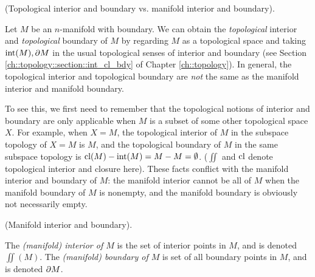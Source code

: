 \begin{remark}
     (Topological interior and boundary vs. manifold interior and boundary).
        
    Let $M$ be an $n$-manifold with boundary. We can obtain the \textit{topological} interior and \textit{topological} boundary of $M$ by regarding $M$ as a topological space and taking $\text{int}(M), \partial M$ in the usual topological senses of interior and boundary (see Section \ref{ch::topology::section::int_cl_bdy} of Chapter \ref{ch::topology}). In general, the topological interior and topological boundary are \textit{not} the same as the manifold interior and manifold boundary.
        
    To see this, we first need to remember that the topological notions of interior and boundary are only applicable when $M$ is a subset of some other topological space $X$.  For example, when $X = M$, the topological interior of $M$ in the subspace topology of $X = M$ is $M$, and the topological boundary of $M$ in the same subspace topology is $\text{cl}(M) - \text{int}(M) = M - M = \emptyset$. ($\iint$ and $\text{cl}$ denote topological interior and closure here). These facts conflict with the manifold interior and boundary of $M$: the manifold interior cannot be all of $M$ when the manifold boundary of $M$ is nonempty, and the manifold boundary is obviously not necessarily empty.
        
        
        
\end{remark}

\begin{defn}
     (Manifold interior and boundary).
    
    The \textit{(manifold) interior of $M$} is the set of interior points in $M$, and is denoted $\iint(M)$. The \textit{(manifold) boundary of $M$} is set of all boundary points in $M$, and is denoted $\partial M$.
\end{defn}


